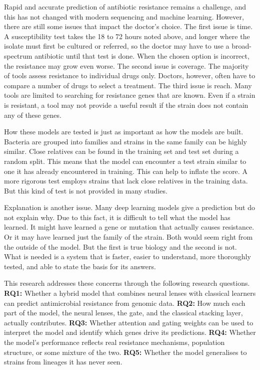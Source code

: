 \documentclass[journal]{IEEEtran}
\begin{document}
Rapid and accurate prediction of antibiotic resistance remains a challenge, and
this has not changed with modern sequencing and machine learning. However, there
are still some issues that impact the doctor's choice. The first issue is time. A
susceptibility test takes the 18 to 72 hours noted above, and longer where the
isolate must first be cultured or referred, so the doctor may have to use a
broad-spectrum antibiotic until that test is done. When the chosen option is
incorrect, the resistance may grow even worse. The second issue is coverage. The
majority of tools assess resistance to individual drugs only. Doctors, however,
often have to compare a number of drugs to select a treatment. The third issue is
reach. Many tools are limited to searching for resistance genes that are known.
Even if a strain is resistant, a tool may not provide a useful result if the strain
does not contain any of these genes.

How these models are tested is just as important as how the models are built.
Bacteria are grouped into families and strains in the same family can be highly
similar. Close relatives can be found in the training set and test set during a
random split. This means that the model can encounter a test strain similar to one
it has already encountered in training. This can help to inflate the score. A more
rigorous test employs strains that lack close relatives in the training data. But
this kind of test is not provided in many studies.

Explanation is another issue. Many deep learning models give a prediction but do
not explain why. Due to this fact, it is difficult to tell what the model has
learned. It might have learned a gene or mutation that actually causes resistance.
Or it may have learned just the family of the strain. Both would seem right from
the outside of the model. But the first is true biology and the second is not.
What is needed is a system that is faster, easier to understand, more thoroughly
tested, and able to state the basis for its answers.

This research addresses these concerns through the following research questions.
\textbf{RQ1:} Whether a hybrid model that combines neural lenses with classical
learners can predict antimicrobial resistance from genomic data. \textbf{RQ2:} How
much each part of the model, the neural lenses, the gate, and the classical
stacking layer, actually contributes. \textbf{RQ3:} Whether attention and gating
weights can be used to interpret the model and identify which genes drive its
predictions. \textbf{RQ4:} Whether the model's performance reflects real
resistance mechanisms, population structure, or some mixture of the two.
\textbf{RQ5:} Whether the model generalises to strains from lineages it has never
seen.
\end{document}
